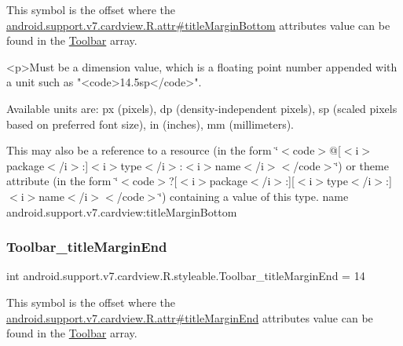 This symbol is the offset where the \hyperlink{classandroid_1_1support_1_1v7_1_1cardview_1_1R_1_1attr_ace29ea625b906bbd584e71a4b1d16516}{android.\+support.\+v7.\+cardview.\+R.\+attr\#title\+Margin\+Bottom} attribute\textquotesingle{}s value can be found in the \hyperlink{classandroid_1_1support_1_1v7_1_1cardview_1_1R_1_1styleable_a26149aeb8fd339abe09ecc9d92b9304f}{Toolbar} array.

\begin{DoxyVerb}      <p>Must be a dimension value, which is a floating point number appended with a unit such as "<code>14.5sp</code>".
\end{DoxyVerb}
 Available units are\+: px (pixels), dp (density-\/independent pixels), sp (scaled pixels based on preferred font size), in (inches), mm (millimeters). 

This may also be a reference to a resource (in the form \char`\"{}$<$code$>$@\mbox{[}$<$i$>$package$<$/i$>$\+:\mbox{]}$<$i$>$type$<$/i$>$\+:$<$i$>$name$<$/i$>$$<$/code$>$\char`\"{}) or theme attribute (in the form \char`\"{}$<$code$>$?\mbox{[}$<$i$>$package$<$/i$>$\+:\mbox{]}\mbox{[}$<$i$>$type$<$/i$>$\+:\mbox{]}$<$i$>$name$<$/i$>$$<$/code$>$\char`\"{}) containing a value of this type.  name android.\+support.\+v7.\+cardview\+:title\+Margin\+Bottom \mbox{\label{classandroid_1_1support_1_1v7_1_1cardview_1_1R_1_1styleable_a8f2cddb87416872d939a7d1b70b3756d}} 
\subsubsection{\texorpdfstring{Toolbar\+\_\+title\+Margin\+End}{Toolbar\_titleMarginEnd}}
{\footnotesize\ttfamily int android.\+support.\+v7.\+cardview.\+R.\+styleable.\+Toolbar\+\_\+title\+Margin\+End = 14\hspace{0.3cm}{\ttfamily [static]}}

This symbol is the offset where the \hyperlink{classandroid_1_1support_1_1v7_1_1cardview_1_1R_1_1attr_ad40d5056e5b59a08e333810b3d2c4ee0}{android.\+support.\+v7.\+cardview.\+R.\+attr\#title\+Margin\+End} attribute\textquotesingle{}s value can be found in the \hyperlink{classandroid_1_1support_1_1v7_1_1cardview_1_1R_1_1styleable_a26149aeb8fd339abe09ecc9d92b9304f}{Toolbar} array.

